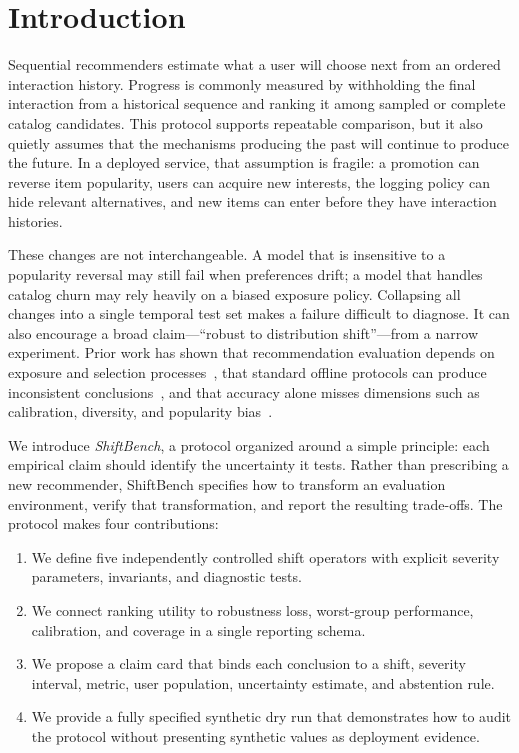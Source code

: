 \section{Introduction}
\label{sec:introduction}

Sequential recommenders estimate what a user will choose next from an ordered
interaction history.  Progress is commonly measured by withholding the final
interaction from a historical sequence and ranking it among sampled or complete
catalog candidates.  This protocol supports repeatable comparison, but it also
quietly assumes that the mechanisms producing the past will continue to produce
the future.  In a deployed service, that assumption is fragile: a promotion can
reverse item popularity, users can acquire new interests, the logging policy can
hide relevant alternatives, and new items can enter before they have interaction
histories.

These changes are not interchangeable.  A model that is insensitive to a
popularity reversal may still fail when preferences drift; a model that handles
catalog churn may rely heavily on a biased exposure policy.  Collapsing all
changes into a single temporal test set makes a failure difficult to diagnose.
It can also encourage a broad claim---``robust to distribution shift''---from a
narrow experiment.  Prior work has shown that recommendation evaluation depends
on exposure and selection processes~\cite{Schnabel2016,Saito2020}, that standard
offline protocols can produce inconsistent conclusions~\cite{Cremonesi2010},
and that accuracy alone misses dimensions such as calibration, diversity, and
popularity bias~\cite{Steck2018,Abdollahpouri2019}.

We introduce \emph{ShiftBench}, a protocol organized around a simple principle:
each empirical claim should identify the uncertainty it tests.
Rather than prescribing a new recommender, ShiftBench specifies how to transform
an evaluation environment, verify that transformation, and report the resulting
trade-offs.  The protocol makes four contributions:

\begin{enumerate}[leftmargin=*,itemsep=2pt,topsep=3pt]
  \item We define five independently controlled shift operators with explicit
  severity parameters, invariants, and diagnostic tests.
  \item We connect ranking utility to robustness loss, worst-group performance,
  calibration, and coverage in a single reporting schema.
  \item We propose a claim card that binds each conclusion to a shift, severity
  interval, metric, user population, uncertainty estimate, and abstention rule.
  \item We provide a fully specified synthetic dry run that demonstrates how to
  audit the protocol without presenting synthetic values as deployment evidence.
\end{enumerate}

